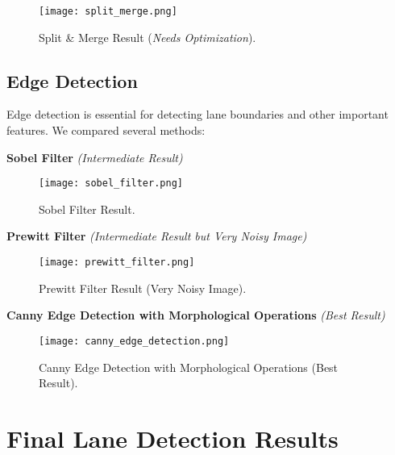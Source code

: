 \documentclass[12pt,a4paper]{article}
\begin{document}
\begin{figure}[h!]
    \centering
    \texttt{[image: split\_merge.png]}
    \caption{Split \& Merge Result (\textit{Needs Optimization}).}
    \label{fig:split_merge}
\end{figure}





\subsection{Edge Detection}

Edge detection is essential for detecting lane boundaries and other important features. We compared several methods:

\vspace{0.5em} %
\textbf{Sobel Filter} \textit{(Intermediate Result)}

\begin{figure}[h!]
    \centering
    \texttt{[image: sobel\_filter.png]}
    \caption{Sobel Filter Result.}
    \label{fig:sobel_filter}
\end{figure}

\vspace{0.5em} %
\textbf{Prewitt Filter} \textit{(Intermediate Result but Very Noisy Image)}

\begin{figure}[h!]
    \centering
    \texttt{[image: prewitt\_filter.png]}
    \caption{Prewitt Filter Result (Very Noisy Image).}
    \label{fig:prewitt_filter}
\end{figure}

\textbf{Canny Edge Detection with Morphological Operations} \textit{(Best Result)}

\begin{figure}[h!]
    \centering
    \texttt{[image: canny\_edge\_detection.png]}
    \caption{Canny Edge Detection with Morphological Operations (Best Result).}
    \label{fig:canny_edge_detection}
\end{figure}




\newpage %

\section{Final Lane Detection Results}
\end{document}
